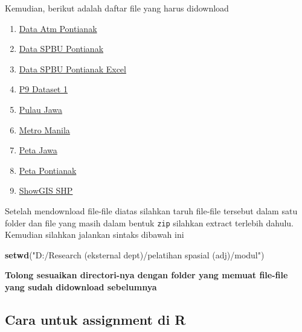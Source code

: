 \documentclass[
]{book}
\newenvironment{Shaded}{\begin{snugshade}}{\end{snugshade}}
\newcommand{\KeywordTok}[1]{\textcolor[rgb]{0.13,0.29,0.53}{\textbf{#1}}}
\newcommand{\NormalTok}[1]{#1}
\newcommand{\StringTok}[1]{\textcolor[rgb]{0.31,0.60,0.02}{#1}}
\providecommand{\tightlist}{%
  \setlength{\itemsep}{0pt}\setlength{\parskip}{0pt}}
\begin{document}
Kemudian, berikut adalah daftar file yang harus didownload

\begin{enumerate}
\def\labelenumi{\arabic{enumi}.}
\tightlist
\item
  \href{https://github.com/raoy/Pelatihan-Spasial/raw/main/DATA\%20ATM\%20PONTIANAK.csv}{Data Atm Pontianak}
\item
  \href{https://github.com/raoy/Pelatihan-Spasial/raw/main/Data\%20SPBU\%20Pontianak.csv}{Data SPBU Pontianak}
\item
  \href{https://github.com/raoy/Pelatihan-Spasial/raw/main/Data\%20SPBU\%20Pontianak.xlsx}{Data SPBU Pontianak Excel}
\item
  \href{https://github.com/raoy/Pelatihan-Spasial/raw/main/P9\%20Dataset\%201.xlsx}{P9 Dataset 1}
\item
  \href{https://github.com/raoy/Pelatihan-Spasial/raw/main/Pulau\%20Jawa.csv}{Pulau Jawa}
\item
  \href{https://github.com/raoy/Pelatihan-Spasial/raw/main/metromanila.csv}{Metro Manila}
\item
  \href{https://github.com/raoy/Pelatihan-Spasial/raw/main/Jawamap.zip}{Peta Jawa}
\item
  \href{https://github.com/raoy/Pelatihan-Spasial/raw/main/Peta\%20Pontianak.zip}{Peta Pontianak}
\item
  \href{https://github.com/raoy/Pelatihan-Spasial/raw/main/SnowGIS_SHP.zip}{ShowGIS SHP}
\end{enumerate}

Setelah mendownload file-file diatas silahkan taruh file-file tersebut dalam satu folder dan file yang masih dalam bentuk \texttt{zip} silahkan extract terlebih dahulu. Kemudian silahkan jalankan sintaks dibawah ini

\begin{Shaded}
\begin{Highlighting}[]
\KeywordTok{setwd}\NormalTok{(}\StringTok{"D:/Research (eksternal dept)/pelatihan spasial (adj)/modul"}\NormalTok{)}
\end{Highlighting}
\end{Shaded}

\textbf{Tolong sesuaikan directori-nya dengan folder yang memuat file-file yang sudah didownload sebelumnya}

\hypertarget{cara-untuk-assignment-di-r}{%
\subsection{Cara untuk assignment di R}\label{cara-untuk-assignment-di-r}}
\end{document}
